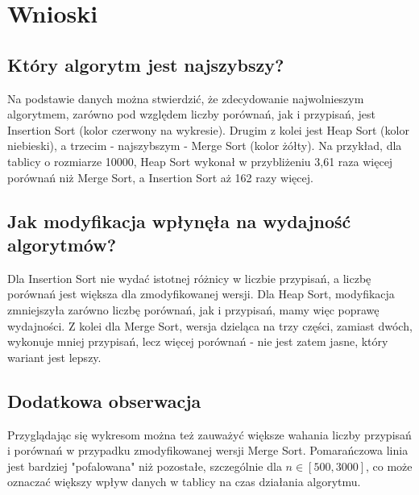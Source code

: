 \documentclass{article}
\begin{document}
\section{Wnioski}

\subsection{Który algorytm jest najszybszy?}

Na podstawie danych można stwierdzić, że zdecydowanie najwolnieszym algorytmem, zarówno pod względem liczby porównań, jak i przypisań, jest Insertion Sort (kolor czerwony na wykresie). Drugim z kolei jest Heap Sort (kolor niebieski), a trzecim - najszybszym - Merge Sort (kolor żółty). Na przykład, dla tablicy o rozmiarze 10000, Heap Sort wykonał w przybliżeniu 3,61 raza więcej porównań niż Merge Sort, a Insertion Sort aż 162 razy więcej. 

\subsection{Jak modyfikacja wpłynęła na wydajność algorytmów?}

Dla Insertion Sort nie wydać istotnej różnicy w liczbie przypisań, a liczbę porównań jest większa dla zmodyfikowanej wersji. Dla Heap Sort, modyfikacja zmniejszyła zarówno liczbę porównań, jak i przypisań, mamy więc poprawę wydajności. Z kolei dla Merge Sort, wersja dzieląca na trzy części, zamiast dwóch, wykonuje mniej przypisań, lecz więcej porównań - nie jest zatem jasne, który wariant jest lepszy.

\subsection{Dodatkowa obserwacja}

Przyglądając się wykresom można też zauważyć większe wahania liczby przypisań i porównań w przypadku zmodyfikowanej wersji Merge Sort. Pomarańczowa linia jest bardziej "pofalowana" niż pozostałe, szczególnie dla \(n \in [500, 3000]\), co może oznaczać większy wpływ danych w tablicy na czas działania algorytmu.
\end{document}
